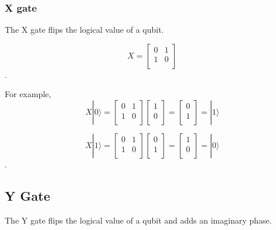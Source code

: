 \subsubsection{X gate}

The X gate flips the logical value of a qubit.

\begin{equation}
X = \begin{bmatrix}
0 & 1 \\
1 & 0 \\
\end{bmatrix}
\end{equation}.

For example,
\begin{equation}
X|0\rangle = \begin{bmatrix}
0 & 1 \\
1 & 0 \\
\end{bmatrix} 
\left[
\begin{array}{c}
1 \\
0 \\
\end{array}
\right]
= \left[
\begin{array}{c}
0 \\
1 \\
\end{array}
\right]
= |1\rangle
\end{equation}

\begin{equation}
 X|1\rangle = \begin{bmatrix}
0 & 1 \\
1 & 0 \\
\end{bmatrix} 
\left[
\begin{array}{c}
0 \\
1  \\
\end{array}
\right]
= \left[
\begin{array}{c}
1 \\
0 \\
\end{array}
\right]
= |0\rangle
\end{equation}.

\subsection{Y Gate}

The Y gate flips the logical value of a qubit and adds an imaginary phase.

